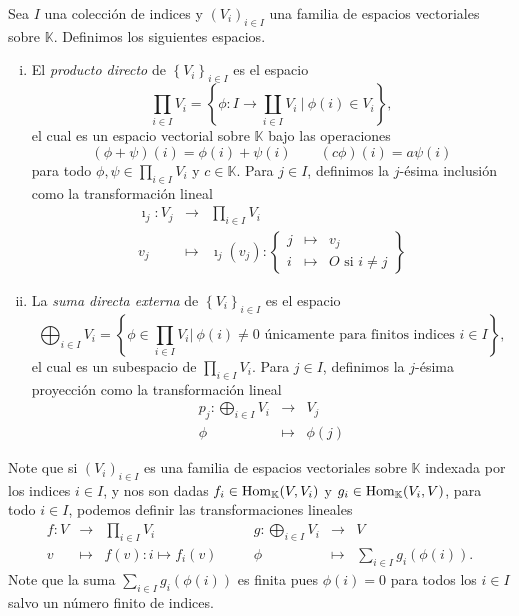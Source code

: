 \begin{defn}\label{productoysuma}
Sea $I$ una colecci\'on de indices y $\left(V_i\right)_{i\in I}$ una familia de espacios vectoriales sobre $\mathbb{K}$. Definimos los siguientes espacios.
\begin{enumerate}[(i)]
\item El \emph{producto directo} de $\left\{V_i\right\}_{i\in I}$ es el espacio
\[
\prod_{i\in I} V_i=\left\{\phi: I\rightarrow \coprod_{i\in I}V_i\ \Big|\ \phi(i)\in V_i\right\},
\]
el cual es un espacio vectorial sobre $\mathbb{K}$ bajo las operaciones
\[
(\phi+\psi)(i)=\phi(i)+\psi(i)\qquad (c\phi)(i)=a\psi(i)
\]
para todo $\phi,\psi\in \prod_{i\in I} V_i$ y $c\in \mathbb{K}$. Para $j\in I$, definimos la $j$-ésima inclusión como la transformación lineal
\begin{eqnarray*}
  \imath_j: V_j & \longrightarrow &\prod_{i\in I} V_i\\
    v_j & \longmapsto & \imath_j(v_j):\left\{\begin{array}{rcl}
                                              j& \mapsto & v_j\\
                                              i& \mapsto & O\text{ si } i\ne j
                                            \end{array}\right\}
\end{eqnarray*}
\item La \emph{suma directa externa} de $\left\{V_i\right\}_{i\in I}$ es el espacio
\[
\bigoplus_{i\in I} V_i=\left\{\phi\in \prod_{i\in I} V_i \Big|\ \phi(i)\ne 0\textrm{ \'unicamente para finitos indices } i\in I\right\},
\]
el cual es un subespacio de $\prod_{i\in I} V_i$. Para $j\in I$, definimos la $j$-ésima proyección como la transformación lineal
\begin{eqnarray*}
  p_j: \bigoplus_{i\in I} V_i & \longrightarrow & V_j\\
    \phi & \longmapsto & \phi(j)
\end{eqnarray*}
\end{enumerate} 
\end{defn}

\begin{obs}\label{propiedaduniversalproductoysuma}
Note que si $\left(V_i\right)_{i\in I}$ es una familia de espacios vectoriales sobre $\mathbb{K}$ indexada por los indices $i\in I$, y nos son dadas $f_i\in\operatorname{Hom}_\mathbb{K}(V,V_i)$ y $g_i\in\operatorname{Hom}_\mathbb{K}(V_i,V)$, para todo $i\in I$, podemos definir las transformaciones lineales
\[
\begin{array}{rclcrcl}
f:V& \longrightarrow & \prod_{i\in I} V_i &\quad& g: \bigoplus_{i\in I} V_i & \longrightarrow & V \\
  v & \longmapsto & f(v):i\mapsto f_i(v) &\quad& \phi & \longmapsto & \sum_{i\in I} g_i\left(\phi(i)\right). 
\end{array}
\]
Note que la suma $\sum_{i\in I} g_i\left(\phi(i)\right)$ es finita pues $\phi(i)=0$ para todos los $i\in I$ salvo un n\'umero finito de indices.
\end{obs}

